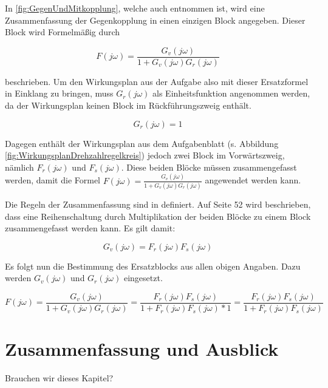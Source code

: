 \documentclass[            %
draft = false,             		%
paper = A4,                		%
pagesize = pdftex,         		%
fontsize = 10pt,           		%
DIV=15,                    		%
twoside = false,           		%
twocolumn = false,         		%
parskip = full,           		%
chapterprefix = false,      		%
appendixprefix = true,     		%
headinclude = false,       		%
footinclude = false,       		%
mpinclude = false,         		%
numbers = auto,            		%
cleardoublepage = plain,   		%
footnotes = multiple,      		%
titlepage = true,          		%
headings = normal,         		%
open = right,              		%
bibliography = openstyle,  		%
listof = chaptergapline,   		%
overfullrule = true,
]{scrbook}
\newcommand{\addtotoc}[1]{
\addcontentsline{toc}{chapter}{
   \texorpdfstring{
      \MakeUppercase{#1}
   }{#1}
   }
}
\begin{document}
In \ref{fig:GegenUndMitkopplung}, welche auch \cite{Skript_Regelungstechnik} entnommen ist, wird eine Zusammenfassung der Gegenkopplung in einen einzigen
Block angegeben. Dieser Block wird Formelmäßig durch 

\begin{equation}
F(j\omega) = \frac{G_v(j\omega)}{1 + G_v(j\omega)G_r(j\omega)}
\end{equation}

beschrieben. Um den Wirkungsplan aus der Aufgabe also mit dieser Ersatzformel in Einklang zu bringen, muss $G_r(j\omega)$ als Einheitsfunktion angenommen werden, da
der Wirkungsplan keinen Block im Rückführungszweig enthält.

\begin{equation}
G_r(j\omega) = 1
\end{equation}

Dagegen enthält der Wirkungsplan aus dem Aufgabenblatt (s. Abbildung \ref{fig:WirkungsplanDrehzahlregelkreis}) jedoch zwei Block im Vorwärtszweig, 
nämlich $F_r(j\omega)$ und $F_s(j\omega)$. Diese beiden Blöcke müssen zusammengefasst werden, damit die Formel $F(j\omega) = \frac{G_v(j\omega)}{1 + G_v(j\omega)G_r(j\omega)}$
angewendet werden kann.

Die Regeln der Zusammenfassung sind in \cite{Skript_Regelungstechnik} definiert. Auf Seite 52 wird beschrieben, dass eine Reihenschaltung durch Multiplikation der beiden Blöcke
zu einem Block zusammengefasst werden kann. Es gilt damit:

\begin{equation}
G_v(j\omega) = F_r(j\omega)F_s(j\omega)
\end{equation}

Es folgt nun die Bestimmung des Ersatzblocks aus allen obigen Angaben. Dazu werden $G_v(j\omega)$ und $G_r(j\omega)$ eingesetzt.	

\begin{equation}
F(j\omega) = \frac{G_v(j\omega)}{1 + G_v(j\omega)G_r(j\omega)} = \frac{F_r(j\omega)F_s(j\omega)}{1 + F_r(j\omega)F_s(j\omega) * 1} = \frac{F_r(j\omega)F_s(j\omega)}{1 + F_r(j\omega)F_s(j\omega)}
\end{equation}


\newpage
{\let\clearpage\relax \chapter{Zusammenfassung und Ausblick}} \label{chpt:Conclusion}

Brauchen wir dieses Kapitel?









%
\end{document}
